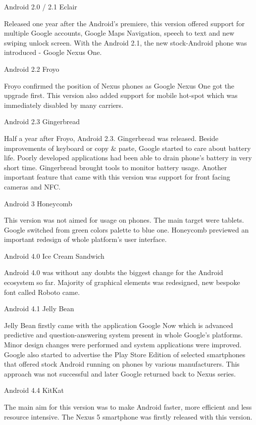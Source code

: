 \seccc Android 2.0 / 2.1 Eclair

Released one year after the Android's premiere, this version offered support for multiple Google accounts, Google Maps Navigation, speech to text and new swiping unlock screen. With the Android 2.1, the new stock-Android phone was introduced  - Google Nexus One. 

\seccc Android 2.2 Froyo

Froyo confirmed the position of Nexus phones as Google Nexus One got the upgrade first. This version also added support for mobile hot-spot which was immediately disabled by many carriers. 

\seccc Android 2.3 Gingerbread

Half a year after Froyo, Android 2.3. Gingerbread was released. Beside improvements of keyboard or copy \& paste, Google started to care about battery life. Poorly developed applications had been able to drain phone's battery in very short time. Gingerbread brought tools to monitor battery usage. Another important feature that came with this version was support for front facing cameras and NFC.

\seccc Android 3 Honeycomb

This version was not aimed for usage on phones. The main target were tablets. Google switched from green colors palette to blue one. Honeycomb previewed an important redesign of whole platform's user interface.

\seccc Android 4.0 Ice Cream Sandwich

Android 4.0 was without any doubts the biggest change for the Android ecosystem so far. Majority of graphical elements was redesigned, new bespoke font called Roboto came. 

\seccc Android 4.1 Jelly Bean

Jelly Bean firstly came with the application Google Now which is advanced predictive and question-answering system present in whole Google's platforms. Minor design changes were performed and system applications were improved. Google also started to advertise the Play Store Edition of selected smartphones that offered stock Android running on phones by various manufacturers. This approach was not successful and later Google returned back to Nexus series.

\seccc Android 4.4 KitKat

The main aim for this version was to make Android faster, more efficient and less resource intensive. The Nexus 5 smartphone was firstly released with this version.


